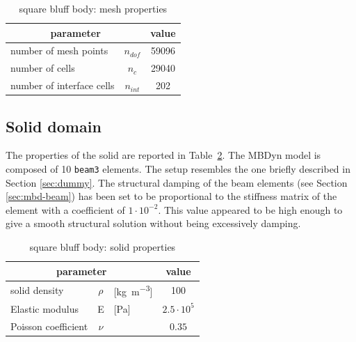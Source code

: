 \begin{table}[!htb]
	\begin{center}
		\begin{tabular}{ l c | c } 
			\multicolumn{2}{c|}{parameter} & value   \\ 
			\hline
			number of mesh points  & $n_{dof}$ & 59096     \\
			number of cells & $n_c$ & 29040  \\
			number of interface cells  & $n_{int}$ & 202  \\			
		\end{tabular}
	\end{center}
	\caption{square bluff body: mesh properties}
	\label{table:sq-mesh}
\end{table}


\subsection{Solid domain}

The properties of the solid are reported in Table~\ref{table:sq-solid}.
The MBDyn model is composed of 10 \texttt{beam3} elements. The setup resembles the one briefly described in Section \ref{sec:dummy}. The structural damping of the beam elements (see Section \ref{sec:mbd-beam}) has been set to be proportional to the stiffness matrix of the element with a coefficient of $1\cdot10^{-2}$. This value appeared to be high enough to give a smooth structural solution without being excessively damping.

\begin{table}[!htb]
	\begin{center}
		\begin{tabular}{ l c  l | c } 
			\multicolumn{3}{c|}{parameter} & value    \\ 
			\hline
			solid density  & $\rho$ & [\si{kg.m^{-3}}] & 100    \\
			Elastic modulus  & E & [\si{Pa}] & $2.5\cdot 10^5$    \\
			Poisson coefficient & $\nu$ & & $0.35$  \\
		\end{tabular}
	\end{center}
	\caption{square bluff body: solid properties}
	\label{table:sq-solid}
\end{table}


